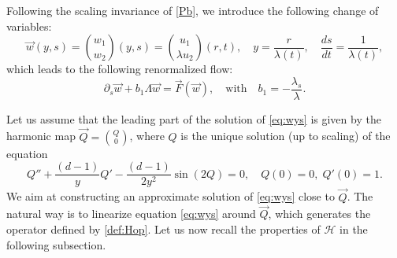 \documentclass[11pt]{aims}
\theoremstyle{definition}
\numberwithin{equation}{section}
\begin{document}
Following the scaling invariance of \eqref{Pb}, we introduce the following change of variables:
\begin{equation}\label{def:simiVars}
\vec w(y,s) = \binom{w_1}{w_2}(y,s) = \binom{u_1}{\lambda u_2}(r,t), \quad y = \frac{r}{\lambda(t)}, \quad \frac{ds}{dt} = \frac{1}{\lambda(t)},
\end{equation}
which leads to the following renormalized flow:
\begin{equation}\label{eq:wys}
\partial_s \vec w +b_1 \Lambda \vec w = \vec F(\vec w), \quad \text{with} \quad b_1 = -\frac{\lambda_s}{\lambda}.
\end{equation}

Let us assume that the leading part of the solution of \eqref{eq:wys} is given by the harmonic map $\vec Q = \binom{Q}{0}$, where $Q$ is the unique  solution (up to scaling) of the equation
\begin{equation}\label{eq:Qy}
Q'' + \frac{(d-1)}{y}Q' - \frac{(d-1)}{2y^2}\sin(2Q) = 0, \quad Q(0) = 0, \; Q'(0) = 1.
\end{equation}
We aim at constructing an approximate solution of \eqref{eq:wys} close to $\vec Q$. The natural way is to linearize equation \eqref{eq:wys} around $\vec Q$, which generates the operator defined by \eqref{def:Hop}. Let us now recall the properties of ${\mathscr{H}}$ in the following subsection.
\end{document}
